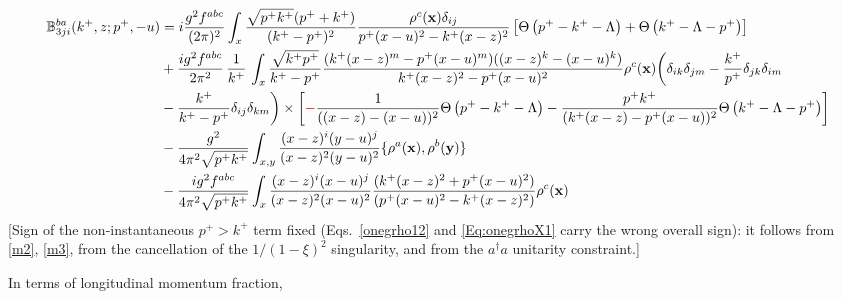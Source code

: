 \documentclass[aps,prd,amsmath,amssymb,nofootinbib]{revtex4-2}
\def\mf#1{\mathbb{#1}}
\def\v#1{\mathbf{#1}}
\numberwithin{equation}{section}
\begin{document}
\begin{align}
   \mf{B}^{ba}_{3ji}(k^+, z;p^+, -u) & = i \frac{g^2 f^{abc}}{(2\pi)^{2}} \int_{x} %
   \frac{\sqrt{p^{+}k^{+}}(p^{+}+k^{+})} {(k^{+}-p^{+})^2} \frac{\rho^c(\v{x}) \delta_{ij}}{p^{+}(x-u)^{2} - k^{+}(x-z)^{2} }\left[\Theta\left(p^{+} - k^{+} - \Lambda \right)+\Theta\left(k^{+}-\Lambda-p^{+}\right)\right]  \notag \\ & + \frac{ig^2 f^{abc}} {2\pi^{2} } \,\frac{1}{k^{+}}\, 
   \int_{x}  
   \frac{\sqrt{k^{+}p^{+}}}{k^{+}-p^{+}} 
   \frac{(k^{+}(x-z)^{m} - p^{+} (x-u)^m)((x-z)^{k} -  (x-u)^{k})} {k^{+}(x-z)^{2} - p^{+} (x-u)^2}
   \rho^c(\v{x}) \bigg( 
  \delta_{ik} \delta_{jm}
  - \frac{k^{+}}{p^{+}}\delta_{jk} \delta_{im}
 \notag \\ &  - \frac{k^{+}}{k^{+}-p^{+}}\delta_{ij} \delta_{km}
   \bigg)\times\left[{\color{red}-}\frac{1}{((x-z) -  (x-u))^2}\Theta\left(p^{+} - k^{+} - \Lambda \right)-\frac{p^{+}k^{+}}{(k^{+}(x-z) -  p^{+} (x-u))^2} \Theta\left(k^{+}-\Lambda-p^{+}\right)\right]\notag \\ & -\frac{g^{2}}{4\pi^{2} \sqrt{p^{+}k^{+}}}\int_{x,y}\frac{(x-z)^{i} (y-u)^{j}}{(x-z)^{ 2}(y-u)^{2}}\{\rho^{a}(\v{x}),\rho^{b}(\v{y})\} \notag \\ &  -\frac{ig^{2}f^{abc}}{4\pi^{2} \sqrt{p^{+}k^{+}}} \int_{x}\frac{(x-z)^{i}(x-u)^{j}}{(x-z)^{2}(x-u)^{2}}\frac{(k^{+}(x-z)^{2} +p^{+} (x-u)^{2})}{(p^{+} (x-u)^{2}-k^{+}(x-z)^{2})}\rho^{c}(\v{x})
\end{align} {\color{red}[Sign of the non-instantaneous $p^+>k^+$ term fixed (Eqs.~\eqref{onegrho12} and \eqref{Eq:onegrhoX1} carry the wrong overall sign): it follows from \eqref{m2}, \eqref{m3}, from the cancellation of the $1/(1-\xi)^2$ singularity, and from the $a^\dagger a$ unitarity constraint.]}\par\noindent 
In terms of longitudinal momentum fraction,
\end{document}
